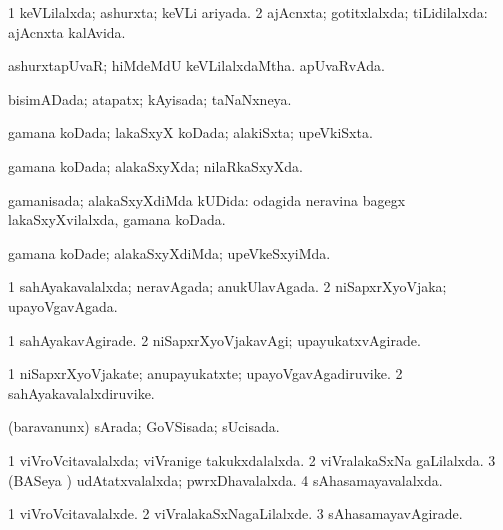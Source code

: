 \bentry
{} 
\gl{\gu}
\expl{}
\bmng
\bnum
\num{1} keVLilalxda; ashurxta; keVLi ariyada. 
\num{2} ajAcnxta; gotitxlalxda; tiLidilalxda:  ajAcnxta kalAvida. 
\enum
\emng
\eentry

\bentry
{} 
\gl{\gu}
\expl{}
\bmng
\banum
{} ashurxtapUvaR; hiMdeMdU keVLilalxdaMtha. 
 apUvaRvAda. 
\eanum
\emng
\eentry

\bentry
{} 
\gl{\gu}
\bmng
bisimADada; atapatx; kAyisada; taNaNxneya. 
\emng
\eentry

\bentry
{} 
\gl{\gu}
\bmng
gamana koDada; lakaSxyX koDada; alakiSxta; upeVkiSxta. 
\emng
\eentry

\bentry
{} 
\gl{\gu}
\expl{}
\bmng
gamana koDada; alakaSxyXda; nilaRkaSxyXda. 
\emng
\eentry

\bentry
{} 
\gl{\gu}
\expl{}
\bmng
gamanisada; alakaSxyXdiMda kUDida:  odagida neravina bagegx lakaSxyXvilalxda, gamana koDada. 
\emng
\eentry

\bentry
{} 
\gl{\kirxvi}
\expl{}
\bmng
gamana koDade; alakaSxyXdiMda; upeVkeSxyiMda. 
\emng
\eentry

\bentry
{} 
\gl{\gu}
\expl{}
\bmng
\bnum
\num{1} sahAyakavalalxda; neravAgada; anukUlavAgada. 
\num{2} niSapxrXyoVjaka; upayoVgavAgada. 
\enum
\emng
\eentry

\bentry
{} 
\gl{\kirxvi}
\expl{}
\bmng
\bnum
\num{1} sahAyakavAgirade. 
\num{2} niSapxrXyoVjakavAgi; upayukatxvAgirade. 
\enum
\emng
\eentry

\bentry
{} 
\gl{\nA}
\expl{}
\bmng
\bnum
\num{1} niSapxrXyoVjakate; anupayukatxte; upayoVgavAgadiruvike. 
\num{2} sahAyakavalalxdiruvike. 
\enum
\emng
\eentry

\bentry
{} 
\gl{\gu}
\expl{}
\bmng
(baravanunx) sArada; GoVSisada; sUcisada. 
\emng
\eentry

\bentry
{} 
\gl{\gu}
\expl{}
\bmng
\bnum
\num{1} viVroVcitavalalxda; viVranige takukxdalalxda. 
\num{2} viVralakaSxNa gaLilalxda. 
\num{3} (BASeya \vi) udAtatxvalalxda; pwrxDhavalalxda. 
\num{4} sAhasamayavalalxda. 
\enum
\emng
\eentry

\bentry
{} 
\gl{\kirxvi}
\expl{}
\bmng
\bnum
\num{1} viVroVcitavalalxde. 
\num{2} viVralakaSxNagaLilalxde. 
\num{3} sAhasamayavAgirade. 
\enum
\emng
\eentry

